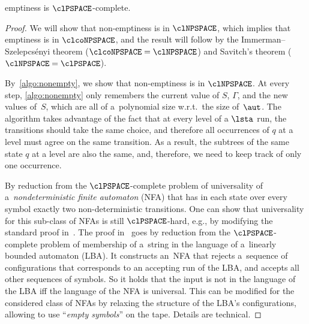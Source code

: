 \begin{theorem}\label{thm:cta_emptiness}
\lsta emptiness is $\clPSPACE$-complete.
\end{theorem}
\begin{proof}
We will show that \lsta non-emptiness is in $\clNPSPACE$, which implies that \lsta emptiness is in $\clcoNPSPACE$, and the result will
follow by the Immerman–Szelep\-csényi theorem ($\clcoNPSPACE = \clNPSPACE$) and
Savitch's theorem ($\clNPSPACE = \clPSPACE$).


\algNonempty

%
By~\cref{algo:nonempty}, we show that \lsta non-emptiness is in $\clNPSPACE$.
At every step, \cref{algo:nonempty} only remembers the current value of $S$,
$\Gamma$, and the new values of~$S$, which are all of a~polynomial size
w.r.t.\ the size of~$\aut$. The algorithm takes advantage of the fact that at every level of a $\lsta$ run, the transitions should take the same choice, and therefore all occurrences of $q$ at a level must agree on the same transition. As a result, the subtrees of the same state $q$ at a level are also the same, and, therefore, we need to keep track of only one occurrence.

By reduction from the $\clPSPACE$-complete problem of universality of
a~\emph{nondeterministic finite automaton} (NFA) that has in each state over
every symbol exactly two non-deterministic transitions.
One can show that universality for this sub-class of NFAs is still
$\clPSPACE$-hard, e.g., by modifying the standard proof
in~\cite[Theorem~3.13]{EsparzaB23}.
The proof in~\cite{EsparzaB23} goes by reduction from the $\clPSPACE$-complete
problem of membership of a~string in the language of a~linearly bounded
automaton (LBA). It constructs an~NFA that rejects a~sequence of
configurations that corresponds to an accepting run of the LBA, and accepts
all other sequences of symbols. So it holds that the input is not in the language of the LBA iff the language of the NFA is universal.
This can be modified for the considered class of NFAs by relaxing the structure
of the LBA's configurations, allowing to use ``\emph{empty symbols}'' on the
tape.  Details are technical.
%


\end{proof}
